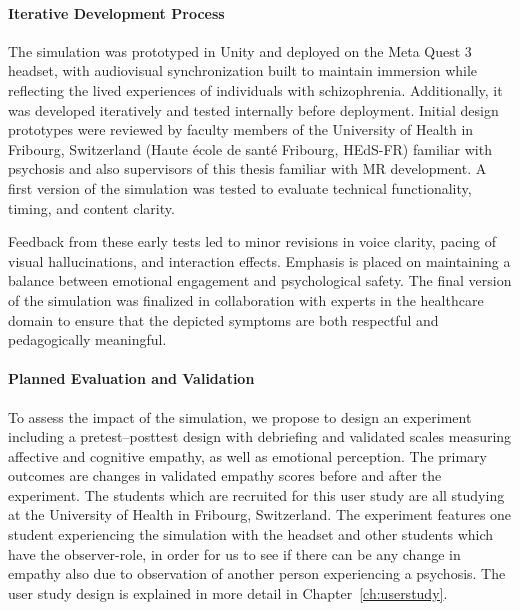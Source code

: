 \paragraph{Iterative Development Process}

The simulation was prototyped in Unity and deployed on the Meta Quest 3 headset, with audiovisual synchronization built to maintain immersion while reflecting the lived experiences of individuals with schizophrenia. Additionally, it was developed iteratively and tested internally before deployment. Initial design prototypes were reviewed by faculty members of the University of Health in Fribourg, Switzerland (Haute école de santé Fribourg, HEdS-FR) familiar with psychosis and also supervisors of this thesis familiar with MR development. A first version of the simulation was tested to evaluate technical functionality, timing, and content clarity.

\vspace{1em}

Feedback from these early tests led to minor revisions in voice clarity, pacing of visual hallucinations, and interaction effects. Emphasis is placed on maintaining a balance between emotional engagement and psychological safety. The final version of the simulation was finalized in collaboration with experts in the healthcare domain to ensure that the depicted symptoms are both respectful and pedagogically meaningful.

\paragraph{Planned Evaluation and Validation}

To assess the impact of the simulation, we propose to design an experiment including a pretest–posttest design with debriefing and validated scales measuring affective and cognitive empathy, as well as emotional perception. The primary outcomes are changes in validated empathy scores before and after the experiment. The students which are recruited for this user study are all studying at the University of Health in Fribourg, Switzerland. The experiment features one student experiencing the simulation with the headset and other students which have the observer-role, in order for us to see if there can be any change in empathy also due to observation of another person experiencing a psychosis. The user study design is explained in more detail in Chapter~\ref{ch:userstudy}.

\vspace{1em}

